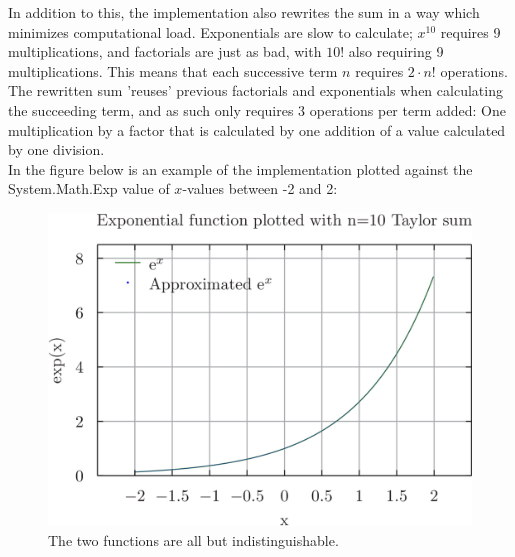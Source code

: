 \documentclass{article}
\begin{document}
In addition to this, the implementation also rewrites the sum in a way which minimizes computational load. Exponentials are slow to calculate; $x^{10}$ requires 9 multiplications, and factorials are just as bad, with $10!$ also requiring 9 multiplications. This means that each successive term $n$ requires $2\cdot n!$ operations. The rewritten sum 'reuses' previous factorials and exponentials when calculating the succeeding term, and as such only requires 3 operations per term added: One multiplication by a factor that is calculated by one addition of a value calculated by one division.\\

In the figure below is an example of the implementation plotted against the System.Math.Exp value of $x$-values between -2 and 2:

\begin{figure}[h!]
    \centering
    \includegraphics[width=\linewidth]{exp.pyxplot.png}
    \caption{The two functions are all but indistinguishable.}
    \label{}
\end{figure}
\end{document}

